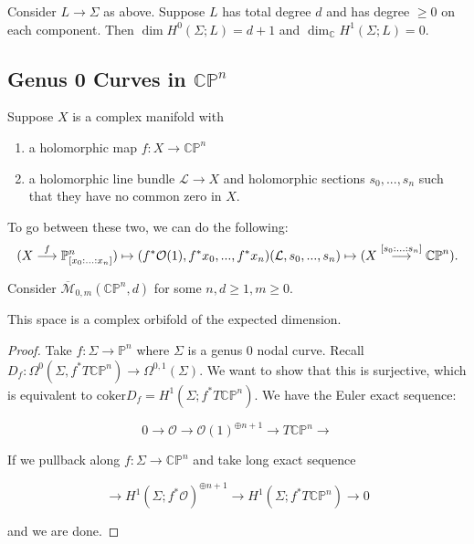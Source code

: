 \begin{corollary}

Consider $L\to \Sigma$ as above. Suppose $L$ has total degree $d$ and has degree $\ge 0$ on each component. Then $\dim H^0(\Sigma; L) = d+1$ and $\dim_{\mathbb{C}} H^1(\Sigma; L)=0$.

\end{corollary}

\subsection{Genus 0 Curves in $\mathbb{CP}^n$}

Suppose $X$ is a complex manifold with
\begin{enumerate}
\item a holomorphic map $f: X\to \mathbb{CP}^n$
\item a holomorphic line bundle $\mathcal{L}\to X$ and holomorphic sections $s_0,...,s_n$ such that they have no common zero in $X$.
\end{enumerate}

To go between these two, we can do the following:
\[
(X\stackrel{f}{\longrightarrow} \mathbb{P}^n_{[x_0:...:x_n]})\mapsto (f^* \mathcal{O}(1), f^*x_0,...,f^*x_n) \\
(\mathcal{L}, s_0,...,s_n) \mapsto (X\stackrel{[s_0:...:s_n]}{\longrightarrow} \mathbb{CP}^n ).
\]

Consider $\overline{\mathcal{M}}_{0,m}(\mathbb{CP}^n, d)$ for some $n, d\ge 1, m\ge 0$.

\begin{lemma}

This space is a complex orbifold of the expected dimension.

\end{lemma}

\begin{proof}
Take $f:\Sigma \to \mathbb{P}^n$ where $\Sigma$ is a genus $0$ nodal curve. Recall $D_f: \Omega^0(\Sigma, f^*T \mathbb{CP}^n)\to \Omega^{0,1}(\Sigma)$. We want to show that this is surjective, which is equivalent to $\text{coker}D_f = H^1(\Sigma; f^* T \mathbb{CP}^n )$. We have the Euler exact sequence:

\[
0 \longrightarrow \mathcal{O} \longrightarrow \mathcal{O}(1)^{\oplus n+1}\longrightarrow T \mathbb{CP}^n \longrightarrow
\]

If we pullback along $f:\Sigma \to \mathbb{CP}^n$ and take long exact sequence

\[
\longrightarrow H^1(\Sigma; f^* \mathcal{O})^{\oplus n+1}\longrightarrow H^1(\Sigma; f^*T \mathbb{CP}^n) \to 0
\]

and we are done.
\end{proof}